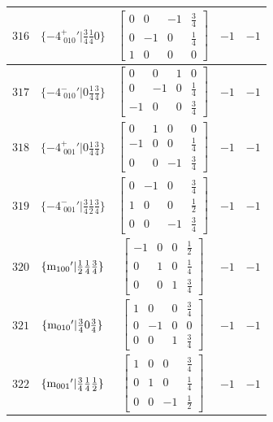 \documentclass[fleqn,8pt]{jsarticle}
\begin{document}
\begin{longtable}{ccccc}
$ 316 $ & $ \{-4^{+}_{\,\,010}{}'|\frac{3}{4} \frac{1}{4} 0\} $ & $ \begin{bmatrix} 0 & 0 & -1 & \frac{3}{4} \\ 0 & -1 & 0 & \frac{1}{4} \\ 1 & 0 & 0 & 0 \end{bmatrix} $ & $ -1 $ & $ -1 $ \\ \hline
$ 317 $ & $ \{-4^{-}_{\,\,010}{}'|0 \frac{1}{4} \frac{3}{4}\} $ & $ \begin{bmatrix} 0 & 0 & 1 & 0 \\ 0 & -1 & 0 & \frac{1}{4} \\ -1 & 0 & 0 & \frac{3}{4} \end{bmatrix} $ & $ -1 $ & $ -1 $ \\ \hline
$ 318 $ & $ \{-4^{+}_{\,\,001}{}'|0 \frac{1}{4} \frac{3}{4}\} $ & $ \begin{bmatrix} 0 & 1 & 0 & 0 \\ -1 & 0 & 0 & \frac{1}{4} \\ 0 & 0 & -1 & \frac{3}{4} \end{bmatrix} $ & $ -1 $ & $ -1 $ \\ \hline
$ 319 $ & $ \{-4^{-}_{\,\,001}{}'|\frac{3}{4} \frac{1}{2} \frac{3}{4}\} $ & $ \begin{bmatrix} 0 & -1 & 0 & \frac{3}{4} \\ 1 & 0 & 0 & \frac{1}{2} \\ 0 & 0 & -1 & \frac{3}{4} \end{bmatrix} $ & $ -1 $ & $ -1 $ \\ \hline
$ 320 $ & $ \{{\rm m}_{100}{}'|\frac{1}{2} \frac{1}{4} \frac{3}{4}\} $ & $ \begin{bmatrix} -1 & 0 & 0 & \frac{1}{2} \\ 0 & 1 & 0 & \frac{1}{4} \\ 0 & 0 & 1 & \frac{3}{4} \end{bmatrix} $ & $ -1 $ & $ -1 $ \\ \hline
$ 321 $ & $ \{{\rm m}_{010}{}'|\frac{3}{4} 0 \frac{3}{4}\} $ & $ \begin{bmatrix} 1 & 0 & 0 & \frac{3}{4} \\ 0 & -1 & 0 & 0 \\ 0 & 0 & 1 & \frac{3}{4} \end{bmatrix} $ & $ -1 $ & $ -1 $ \\ \hline
$ 322 $ & $ \{{\rm m}_{001}{}'|\frac{3}{4} \frac{1}{4} \frac{1}{2}\} $ & $ \begin{bmatrix} 1 & 0 & 0 & \frac{3}{4} \\ 0 & 1 & 0 & \frac{1}{4} \\ 0 & 0 & -1 & \frac{1}{2} \end{bmatrix} $ & $ -1 $ & $ -1 $ \\ \hline

\end{longtable}
\end{document}
